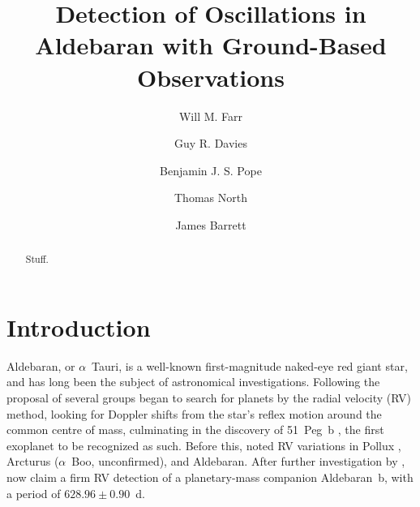 \documentclass[modern]{aastex61}
\begin{document}
\title{Detection of Oscillations in Aldebaran with Ground-Based Observations}

\author[0000-0003-1540-8562]{Will M. Farr} 



\author{Guy R. Davies}


\author[0000-0003-2595-9114]{Benjamin J. S. Pope}

\author{Thomas North}

\author{James Barrett}



\begin{abstract}
Stuff.
\end{abstract}

\section{Introduction}

Aldebaran, or $\alpha$~Tauri, is a well-known first-magnitude naked-eye red giant star, and has long been the subject of astronomical investigations. Following the proposal of \citet{struverv} several groups began to search for planets by the radial velocity (RV) method, looking for Doppler shifts from the star's reflex motion around the common centre of mass, culminating in the discovery of 51~Peg~b \citep{51peg}, the first exoplanet to be recognized as such. Before this, \citet{hatzes1993} noted RV variations in Pollux \citep[$\beta$~Gem; subsequently confirmed as a planet:][]{betgemconf,betgemconf2}, Arcturus ($\alpha$~Boo, unconfirmed), and Aldebaran. After further investigation by \citet{Hatzes1998}, \citet{Hatzes2015} now claim a firm RV detection of a planetary-mass companion Aldebaran~b, with a period of $628.96 \pm 0.90$~d. 
\end{document}
